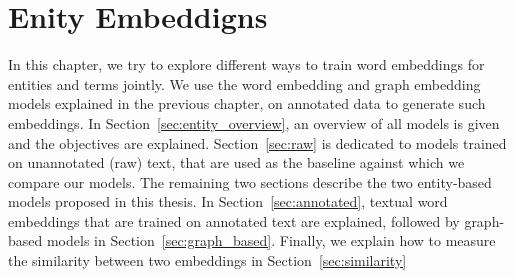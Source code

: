 \chapter{Enity Embeddigns}\label{chap:entity}

In this chapter, we try to explore different ways to train word embeddings for entities and terms jointly. We use the word embedding and graph embedding models explained in the previous chapter, on annotated data to generate such embeddings. In Section~\ref{sec:entity_overview}, an overview of all models is given and the objectives are explained. Section~\ref{sec:raw} is dedicated to models trained on unannotated (raw) text, that are used as the baseline against which we compare our models. The remaining two sections describe the two entity-based models proposed in this thesis. In Section~\ref{sec:annotated},  textual word embeddings that are trained on annotated text are explained, followed by graph-based models in Section~\ref{sec:graph_based}. Finally, we explain how to measure the similarity between two embeddings in Section~\ref{sec:similarity}

